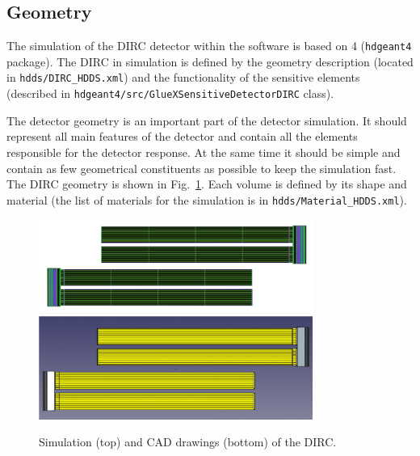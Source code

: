\subsection{Geometry}

The simulation of the \gluex DIRC detector within the \gluex software is based on {\geant}4 (\texttt{hdgeant4} package). The \gluex DIRC in simulation is defined by the geometry description (located in  \texttt{hdds/DIRC{\_}HDDS.xml}) and the functionality of the sensitive elements (described in \texttt{hdgeant4/src/GlueXSensitiveDetectorDIRC} class). 

The detector geometry is an important part of the detector simulation. It should represent all main features of the detector and contain all the elements responsible for the detector response. At the same time it should be simple and contain as few geometrical constituents as possible to keep the simulation fast. The \gluex DIRC geometry is shown in Fig.~\ref{pic:dirc}. Each volume is defined by its shape and material (the list of materials for the \gluex simulation is in \texttt{hdds/Material{\_}HDDS.xml}). 

\begin{figure}[!h]
\centering
\includegraphics[width=0.8\textwidth]{pics/bars1.png}\\
\includegraphics[width=0.8\textwidth]{pics/bars2.png}
\caption{\label{pic:dirc}
Simulation (top) and CAD drawings (bottom) of the \gluex DIRC.
}
\end{figure}  

